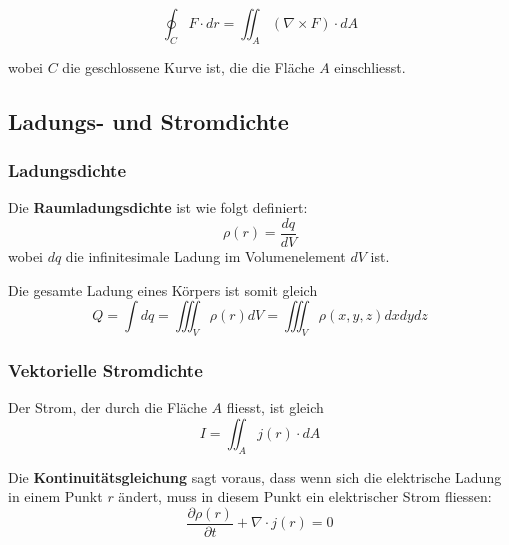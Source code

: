 \documentclass[11pt]{article}
\begin{document}
\begin{equation*}
	\oint _C F \cdot dr = \iint _A (\nabla \times F) \cdot dA
\end{equation*}

wobei $C$ die geschlossene Kurve ist, die die Fläche $A$ einschliesst.

\subsection{Ladungs- und Stromdichte}

\subsubsection{Ladungsdichte}

Die \textbf{Raumladungsdichte} ist wie folgt definiert:
\begin{equation*}
	\rho(r) = \frac{dq}{dV}
\end{equation*}
wobei $dq$ die infinitesimale Ladung im Volumenelement $dV$ ist. \newline

Die gesamte Ladung eines Körpers ist somit gleich
\begin{equation*}
	Q = \int dq = \iiint _V \rho(r) dV = \iiint _V \rho (x,y,z) dx dy dz
\end{equation*}

\subsubsection{Vektorielle Stromdichte}

Der Strom, der durch die Fläche $A$ fliesst, ist gleich
\begin{equation*}
	I = \iint _A j(r) \cdot dA
\end{equation*}

Die \textbf{Kontinuitätsgleichung} sagt voraus, dass wenn sich die elektrische Ladung in einem Punkt $r$ ändert, muss in diesem Punkt ein elektrischer Strom fliessen:
\begin{equation*}
	\frac{\partial\rho (r)}{\partial t} + \nabla\cdot j(r) = 0
\end{equation*}
\end{document}

